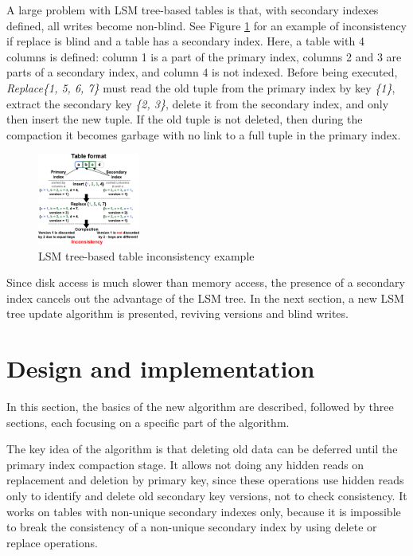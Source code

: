 \documentclass{vldb}
\begin{document}
A large problem with LSM tree-based tables is that, with secondary indexes defined,
all writes become non-blind. See Figure \ref{fig:inconsistent_example}
for an example of inconsistency if replace is blind and a table has a secondary
index. Here, a table with 4 columns is defined: column 1 is a part of the primary index,
columns 2 and 3 are parts of a secondary index, and column 4 is not indexed. Before being
executed, \textit{Replace\{1, 5, 6, 7\}} must read the old tuple from the
primary index by key \textit{\{1\}}, extract the secondary key
\textit{\{2, 3\}}, delete it from the secondary index, and only then insert the
new tuple. If the old tuple is not deleted, then during the compaction it becomes
garbage with no link to a full tuple in the primary index.
\begin{figure}
\centering
\includegraphics[width=0.3\textwidth]{inconsistent_example}
\caption{LSM tree-based table inconsistency example}
\label{fig:inconsistent_example}
\end{figure}

Since disk access is much slower than memory access, the presence of a secondary index
cancels out the advantage of the LSM tree. In the next section, a new LSM tree update
algorithm is presented, reviving versions and blind writes.

\section{Design and implementation}
In this section, the basics of the new algorithm are described, followed by three sections,
each focusing on a specific part of the algorithm.

The key idea of the algorithm is that deleting old data can be deferred until the
primary index compaction stage. It allows not doing any hidden reads on replacement
and deletion by primary key, since these operations use hidden reads only to identify
and delete old secondary key versions, not to check consistency. It works on
tables with non-unique secondary indexes only, because it is impossible to break
the consistency of a non-unique secondary index by using delete or replace operations.
\end{document}
